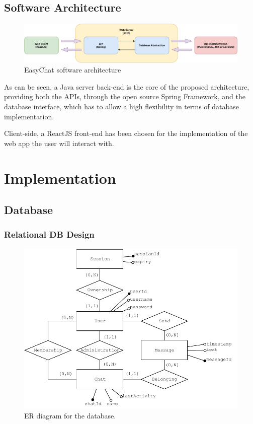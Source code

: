 \documentclass[10pt]{article}
\begin{document}
\subsection{Software Architecture}
\begin{figure}[h!]
	\centering
	\includegraphics[width=\textwidth]{figs/system_architecture}
	\caption{EasyChat software architecture}
	\label{fig:software_architecture}
\end{figure}

As can be seen, a Java server back-end is the core of the proposed architecture, providing both the APIs, through the open source Spring Framework, and the database interface, which has to allow a high flexibility in terms of database implementation.

Client-side, a ReactJS front-end has been chosen for the implementation of the web app the user will interact with.


\clearpage
\section{Implementation}

\subsection{Database}
\subsubsection{Relational DB Design}
\begin{figure}[h!]
    \centering
    \includegraphics[width=\textwidth]{figs/ER}
    \caption{ER diagram for the database.}
    \label{fig:er}
\end{figure}
\end{document}
